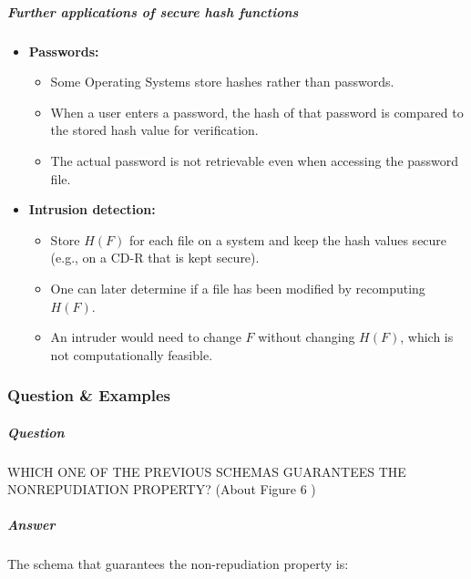\documentclass{article}
\begin{document}
                                \subparagraph{Further
                                applications of
                                secure hash
                                functions}
                                \begin{itemize}
                                    \item \textbf{Passwords:}
                                    \begin{itemize}
                                        \item Some Operating Systems store hashes rather than passwords.
                                        \item When a user enters a password, the hash of that password is compared to the stored hash value for verification.
                                        \item The actual password is not retrievable even when accessing the password file.
                                    \end{itemize}
                                    \item \textbf{Intrusion detection:}
                                    \begin{itemize}
                                        \item Store \( H(F) \) for each file on a system and keep the hash values secure (e.g., on a CD-R that is kept secure).
                                        \item One can later determine if a file has been modified by recomputing \( H(F) \).
                                        \item An intruder would need to change \( F \) without changing \( H(F) \), which is not computationally feasible.
                                    \end{itemize}
                                \end{itemize}
                        \subsubsection{Question \& Examples}
                        \subparagraph{Question} WHICH ONE OF THE PREVIOUS
                        SCHEMAS GUARANTEES THE NONREPUDIATION
                        PROPERTY? (About Figure 6 )
                        \subparagraph{Answer}
                        The schema that guarantees the non-repudiation property is:
\end{document}
